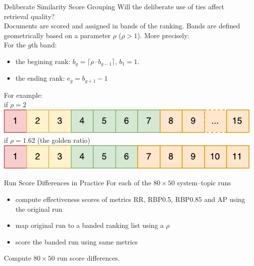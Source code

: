 \documentclass{beamer}
\begin{document}
\begin{frame}{Deliberate Similarity Score Grouping}
Will the deliberate use of ties affect retrieval quality?\\[1em]

Documents are scored and assigned in \alert{bands} of the ranking. Bands are defined geometrically based on a parameter \alert{$\rho$} ($\rho > 1$). More precisely:\\[0.5em]

For the \alert{$g$th} band:
\begin{itemize}
\item the begining rank: $b_g = \lceil{\rho\cdot b_{g-1}}\rceil$, $b_1 = 1$.
\item the ending rank: $e_g = b_{g+1}-1$\\[0.5em]
\end{itemize}
For example:\\
if \alert{$\rho = 2$}\\[0.3em] \text{ } \includegraphics{figs/grouping_exp_rho2.pdf}\\
if \alert{$\rho=1.62$} (the golden ratio)\\[0.3em] \text{ } \includegraphics{figs/grouping_exp_rho162.pdf}
\end{frame}


\begin{frame}{Run Score Differences in Practice}
  For each of the $80 \times 50$ system--topic runs 
  \begin{itemize}
  \item compute effectiveness scores of metrics RR, RBP0.5, RBP0.85 and AP using the {\color{blue}original run}
  \item map original run to a banded ranking list using a $\rho$
  \item score the {\color{blue}banded run} using same metrics\\[1em]
  \end{itemize}
  Compute $80 \times 50$ run score differences.
\end{frame}
\end{document}
